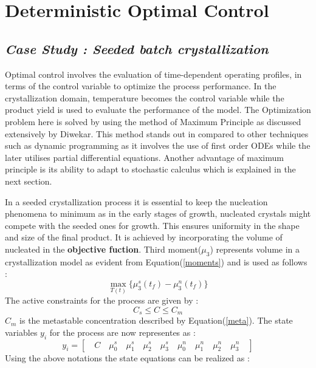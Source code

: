 \documentclass[3p,times]{elsarticle}
\begin{document}
\section{Deterministic Optimal Control}

\subsection{\textit{Case Study : Seeded batch crystallization}}
Optimal control involves the evaluation of time-dependent operating profiles, in terms of the control variable to optimize the process performance. In the crystallization domain, temperature becomes the control variable while the product yield is used to evaluate the performance of the model. The Optimization problem here is solved by using the method of Maximum Principle as discussed extensively by Diwekar\cite{dewikar}. This method stands out in compared to other techniques such as dynamic programming as it involves the use of first order ODEs while the later utilises partial differential equations. Another advantage of maximum principle is its ability to adapt to stochastic calculus which is explained in the next section. \par 
In a seeded crystallization process it is essential to keep the nucleation phenomena to minimum as in the early stages of growth, nucleated crystals might compete with the seeded ones for growth. This ensures uniformity in the shape and size of the final product. It is achieved by incorporating the volume of nucleated in the \textbf{objective fuction}. Third moment($\mu_{3}$) represents volume in a crystallization model as evident from Equation(\ref{moments}) and is used as follows :
\begin{equation}
\max_{T(t)}\lbrace{\mu_{3}^{s}(t_{f}) - \mu_{3}^{n}(t_{f})\rbrace } 
\end{equation}
The active constraints for the process are given by : 
\begin{equation}
C_{s}\leqslant C \leqslant C_{m}
\end{equation}
$C_{m}$ is the metastable concentration described by Equation(\ref{meta}). The state variables $y_{i}$ for the process are now representes as : 
\begin{equation} \label{states}
y_{i} = \left[\quad C \quad \mu_{0}^{s} \quad \mu_{1}^{s}\quad \mu_{2}^{s}\quad \mu_{3}^{s}\quad \mu_{0}^{n}\quad \mu_{1}^{n}\quad \mu_{2}^{n}\quad \mu_{3}^{n}\quad\right]  
\end{equation}
Using the above notations the state equations can be realized as \cite{yenkie} :
\end{document}
